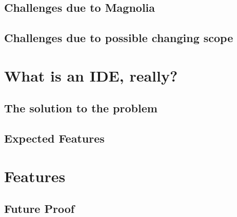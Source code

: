 \documentclass[runningheads]{llncs}
\begin{document}
\subsection{Challenges due to Magnolia}

\subsection{Challenges due to possible changing scope}

\section{What is an IDE, really?}
\subsection{The solution to the problem}
\subsection{Expected Features}

\section{Features}
\subsection{Future Proof}
\end{document}
